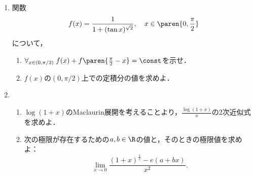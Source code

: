 \documentclass[uplatex,dvipdfmx]{jsarticle}
\begin{document}
\begin{tcolorbox}[colframe=ForestGreen, colback=ForestGreen!10!white,breakable,colbacktitle=ForestGreen!40!white,coltitle=black,fonttitle=\bfseries\sffamily,
    title=第３問]
    \begin{enumerate}[{問}1]
        \item 関数
        \[f(x)=\frac{1}{1+(\tan x)^{\sqrt{2}}},\quad x\in\paren{0,\frac{\pi}{2}}\]
        について，
        \begin{enumerate}
            \item $\forall_{x\in(0,\pi/2)}\;f(x)+f\paren{\frac{\pi}{2}-x}=\const$を示せ．
            \item $f(x)$の$(0,\pi/2)$上での定積分の値を求めよ．
        \end{enumerate}
        \item 
        \begin{enumerate}
            \item $\log(1+x)$のMaclaurin展開を考えることより，$\frac{\log(1+x)}{x}$の2次近似式を求めよ．
            \item 次の極限が存在するための$a,b\in\R$の値と，そのときの極限値を求めよ：
            \[\lim_{x\to0}\frac{(1+x)^{\frac{1}{x}}-e(a+bx)}{x^2}.\]
        \end{enumerate}
    \end{enumerate}
\end{tcolorbox}
\end{document}
